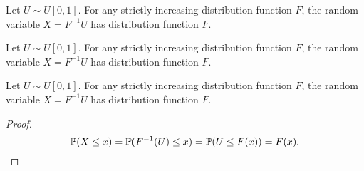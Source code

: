 \begin{note}
  \begin{field}
    \begin{thm}
      Let $U\sim U[0, 1]$. For any strictly increasing distribution function $F$, the random variable $X = F^{-1}U$ has distribution function $F$.
    \end{thm}
  \end{field}
  \begin{field}
    \begin{thm}
      Let $U\sim U[0, 1]$. For any strictly increasing distribution function $F$, the random variable $X = F^{-1}U$ has distribution function $F$.
    \end{thm}
  \end{field}
  \xplain{}%
\end{note}

%
\begin{note}
  \begin{field}
    \begin{thm}
      Let $U\sim U[0, 1]$. For any strictly increasing distribution function $F$, the random variable $X = F^{-1}U$ has distribution function $F$.
    \end{thm}
  \end{field}
  \begin{field}
    \begin{proof}
      \[
        \P(X \leq x) = \P(F^{-1}(U) \leq x) = \P(U \leq F(x)) = F(x).\qedhere
      \]
    \end{proof}
  \end{field}
  \xplain{}%
\end{note}

